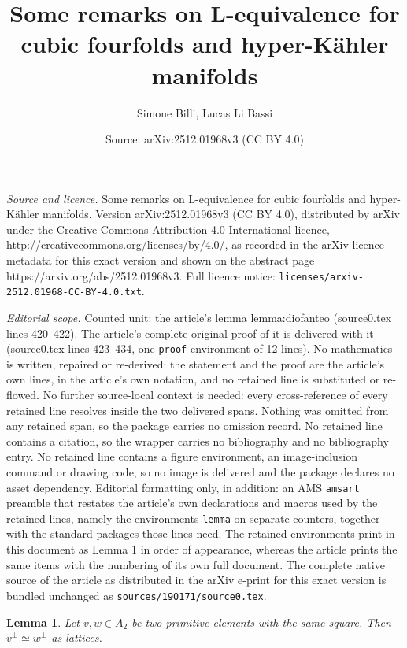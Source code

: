 \documentclass[10pt,a4paper]{amsart}
\title{Some remarks on L-equivalence for cubic fourfolds and hyper-Kähler manifolds}
\author{Simone Billi, Lucas Li Bassi}
\date{Source: arXiv:2512.01968v3 (CC BY 4.0)}
\newtheorem{lemma}{Lemma}
\begin{document}
\maketitle

\noindent\emph{Source and licence.} Some remarks on L-equivalence for cubic fourfolds and hyper-Kähler manifolds. Version arXiv:2512.01968v3 (CC BY 4.0), distributed by arXiv under the Creative Commons Attribution 4.0 International licence, http://creativecommons.org/licenses/by/4.0/, as recorded in the arXiv licence metadata for this exact version and shown on the abstract page https://arxiv.org/abs/2512.01968v3. Full licence notice: \texttt{licenses/arxiv-2512.01968-CC-BY-4.0.txt}.\par\smallskip

\noindent\textit{Editorial scope.} Counted unit: the article's lemma lemma:diofanteo (source0.tex lines 420--422). The article's complete original proof of it is delivered with it (source0.tex lines 423--434, one \texttt{proof} environment of 12 lines). No mathematics is written, repaired or re-derived: the statement and the proof are the article's own lines, in the article's own notation, and no retained line is substituted or re-flowed.  No further source-local context is needed: every cross-reference of every retained line resolves inside the two delivered spans.  Nothing was omitted from any retained span, so the package carries no omission record.  No retained line contains a citation, so the wrapper carries no bibliography and no bibliography entry.  No retained line contains a figure environment, an image-inclusion command or drawing code, so no image is delivered and the package declares no asset dependency.  Editorial formatting only, in addition: an AMS \texttt{amsart} preamble that restates the article's own declarations and macros used by the retained lines, namely the environments \texttt{lemma} on separate counters, together with the standard packages those lines need.  The retained environments print in this document as Lemma 1 in order of appearance, whereas the article prints the same items with the numbering of its own full document.  The complete native source of the article as distributed in the arXiv e-print for this exact version is bundled unchanged as \texttt{sources/190171/source0.tex}.
\begin{lemma}\label{lemma:diofanteo}
    Let $v, w\in A_2$ be two primitive elements with the same square. Then $v^{\perp}\simeq w^{\perp}$ as lattices.
\end{lemma}
\end{document}
